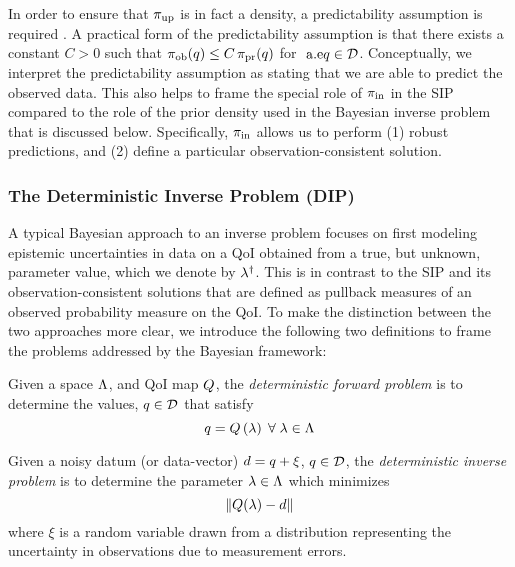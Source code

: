 In order to ensure that $\operatorname*{\pi_{up}}$ is in fact a density, a predictability assumption is required \cite{BJW18a}.
A practical form of the predictability assumption is that there exists a constant $C>0$ such that $\operatorname*{\pi_{ob}}(q)\leq C\operatorname*{\pi_{pr}}(q)$ for $\text{ a.e} q\in\mathcal{D}$.
Conceptually, we interpret the predictability assumption as stating that we are able to predict the observed data.
This also helps to frame the special role of $\operatorname*{\pi_{in}}$ in the SIP compared to the role of the prior density used in the Bayesian inverse problem that is discussed below.
Specifically, $\operatorname*{\pi_{in}}$ allows us to perform (1) robust predictions, and (2) define a particular observation-consistent solution.




\subsubsection{The Deterministic Inverse Problem (DIP)}
A typical Bayesian approach to an inverse problem focuses on first modeling epistemic uncertainties in data on a QoI obtained from a true, but unknown, parameter value, which we denote by $\lambda^\dagger$.
This is in contrast to the SIP and its observation-consistent solutions that are defined as pullback measures of an observed probability measure on the QoI.
To make the distinction between the two approaches more clear, we introduce the following two definitions to frame the problems addressed by the Bayesian framework:


\begin{defn}
  Given a space ${\Lambda}$, and QoI map $Q$, the \emph{deterministic forward problem} is to determine the values, $q \in \mathcal{D}$ that satisfy
  \begin{equation}
    q = Q\left ( \lambda \right ) \; \forall \; \lambda \in {\Lambda}
  \end{equation}
\end{defn}

\begin{defn}
  Given a noisy datum (or data-vector) $d = q + \xi$, $q \in \mathcal{D}$, the \emph{deterministic inverse problem} is to determine the parameter $\lambda \in {\Lambda}$ which minimizes
  \begin{equation}
    \left\Vert Q(\lambda) - d\right\Vert
  \end{equation}
  where $\xi$ is a random variable drawn from a distribution representing the uncertainty in observations due to measurement errors.
\end{defn}

